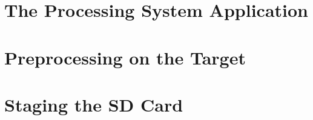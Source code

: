\section{The Processing System Application}
\label{sec:ps-app}

\section{Preprocessing on the Target}
\label{sec:preproc-target}

\section{Staging the SD Card}
\label{sec:sdcard}

